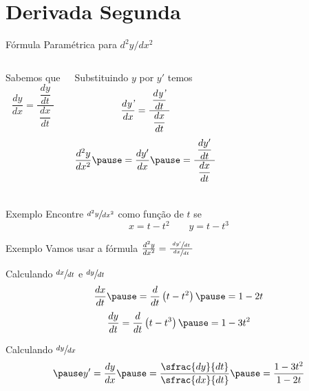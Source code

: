 \section{Derivada Segunda}

\begin{frame}{Fórmula Paramétrica para \(d^2y/dx^2\)}
  \begin{columns}
      Sabemos que
      \[
        \frac{dy}{dx} = \frac{\;\dfrac{dy}{dt}\;}{\dfrac{dx}{dt}}
      \]

      \pause
      Substituindo $y$ por $y'$ temos
      \[
        \frac{d\emph{y'}}{dx} = \frac{\;\dfrac{d\emph{y'}}{dt}\;}{\dfrac{dx}{dt}}
      \]
      \pause
      \emph{
      \[
        \frac{d^2y}{dx^2}
        \pause
        = \frac{d y'}{dx}
        \pause
        = \frac{\;\dfrac{dy'}{dt}\;}{\dfrac{dx}{dt}}
      \]}
  \end{columns}
\end{frame}

\addtocounter{exemplo}{1}
\begin{frame}{Exemplo \theexemplo}
  Encontre \(\sfrac{d^2y}{dx^2}\) como função de $t$ se
  \[
    x = t - t^2 \qquad
    y = t - t^3
  \]
\end{frame}

\begin{frame}{Exemplo \theexemplo}
  Vamos usar a fórmula
  \(
    \frac{d^2y}{dx^2}
    = \frac{\;\sfrac{dy'}{dt}\;}{\sfrac{dx}{dt}}
  \)

  \pause
  Calculando \(\sfrac{dx}{dt}\) e \(\sfrac{dy}{dt}\)
  \pause
  \[
    \frac{dx}{dt}
    \pause
    = \frac{d}{dt}\left(t - t^2\right)
    \pause
    = 1 - 2t
  \]
  \pause
  \[
    \frac{dy}{dt}
    = \frac{d}{dt}\left(t - t^3\right)
    \pause
    = 1 - 3t^2
  \]

  \pause
  Calculando \(\sfrac{dy}{dx}\)
  \[
    \pause
    y'
    = \frac{dy}{dx}
    \pause
    = \frac{\sfrac{dy}{dt}}{\sfrac{dx}{dt}}
    \pause
    = \frac{1 - 3t^2}{1 - 2t}
  \]
\end{frame}

